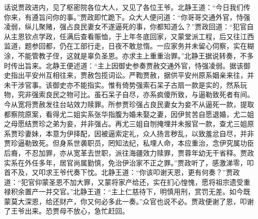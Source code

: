 


\begin{parag}
    话说贾政进内，见了枢密院各位大人，又见了各位王爷。北静王道：“今日我们传你来，有遵旨问你的事。”贾政即忙跪下。众大人便问道：“你哥哥交通外官，恃强凌弱，纵儿聚赌，强占良民妻女不遂逼死的事，你都知道么？”贾政回道：“犯官自从主恩钦点学政，任满后查看赈恤，于上年冬底回家，又蒙堂派工程，后又往江西监道，题参回都，仍在工部行走，日夜不敢怠惰。一应家务并未留心伺察，实在糊涂，不能管教子侄，这就是辜负圣恩。亦求主上重重治罪。”北静王据说转奏，不多时传出旨来。北静王便述道：“主上因御史参奏贾赦交通外官，恃强凌弱。据该御史指出平安州互相往来，贾赦包揽词讼。严鞫贾赦，据供平安州原系姻亲来往，并未干涉官事。该御史亦不能指实。惟有倚势强索石呆子古扇一款是实的，然系玩物，究非强索良民之物可比。虽石呆子自尽，亦系疯傻所致，与逼勒致死者有间。今从宽将贾赦发往台站效力赎罪。所参贾珍强占良民妻女为妾不从逼死一款，提取都察院原案，看得尤二姐实系张华指腹为婚未娶之妻，因伊贫苦自愿退婚，尤二姐之母愿结贾珍之弟为妾，并非强占。再尤三姐自刎掩埋并未报官一款，查尤三姐原系贾珍妻妹，本意为伊择配，因被逼索定礼，众人扬言秽乱，以致羞忿自尽，并非贾珍逼勒致死。但身系世袭职员，罔知法纪，私埋人命，本应重治，念伊究属功臣后裔，不忍加罪，亦从宽革去世职，派往海疆效力赎罪，贾蓉年幼无干省释。贾政实系在外任多年，居官尚属勤慎，免治伊治家不正之罪。”贾政听了，感激涕零，叩首不及，又叩求王爷代奏下忱。北静王道：“你该叩谢天恩，更有何奏？”贾政道：“犯官仰蒙圣恩不加大罪，又蒙将家产给还，实在扪心惶愧，愿将祖宗遗受重禄积余置产一并交官。”北静王道：“主上仁慈待下，明慎用刑，赏罚无差。如今既蒙莫大深恩，给还财产，你又何必多此一奏。”众官也说不必。贾政便谢了恩，叩谢了王爷出来。恐贾母不放心，急忙赶回。
\end{parag}


